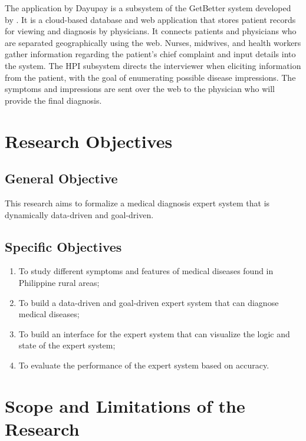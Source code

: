The application by Dayupay is a subsystem of the GetBetter system developed by .
It is a cloud-based database and web application that stores patient records for viewing and diagnosis by physicians.
It connects patients and physicians who are separated geographically using the web.
Nurses, midwives, and health workers gather information regarding the patient's chief complaint and input details into the system.
The HPI subsystem directs the interviewer when eliciting information from the patient, with the goal of enumerating possible disease impressions.
The symptoms and impressions are sent over the web to the physician who will provide the final diagnosis.    

\section{Research Objectives}
\label{sec:researchobjectives}

\subsection{General Objective}
\label{sec:generalobjective}

This research aims to formalize a medical diagnosis expert system that is dynamically data-driven and goal-driven.

\subsection{Specific Objectives}
\label{sec:specificobjectives}


\begin{enumerate}
    \item To study different symptoms and features of medical diseases found in Philippine rural areas;
    \item To build a data-driven and goal-driven expert system that can diagnose medical diseases;
    \item To build an interface for the expert system that can visualize the logic and state of the expert system;
    \item To evaluate the performance of the expert system based on accuracy.
\end{enumerate}


\section{Scope and Limitations of the Research}
\label{sec:scopelimitations}

